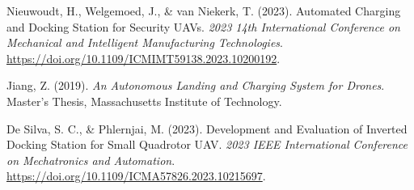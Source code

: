 \begin{thebibliography}{30}
   
    
   
   
    
     Nieuwoudt, H., Welgemoed, J., \& van Niekerk, T. (2023). Automated Charging and Docking Station for Security UAVs. \textit{2023 14th International Conference on Mechanical and Intelligent Manufacturing Technologies}. \url{https://doi.org/10.1109/ICMIMT59138.2023.10200192}.
    
     Jiang, Z. (2019). \textit{An Autonomous Landing and Charging System for Drones}. Master's Thesis, Massachusetts Institute of Technology.
        
    
     De Silva, S. C., \& Phlernjai, M. (2023). Development and Evaluation of Inverted Docking Station for Small Quadrotor UAV. \textit{2023 IEEE International Conference on Mechatronics and Automation}. \url{https://doi.org/10.1109/ICMA57826.2023.10215697}.
    

    

\end{thebibliography}

